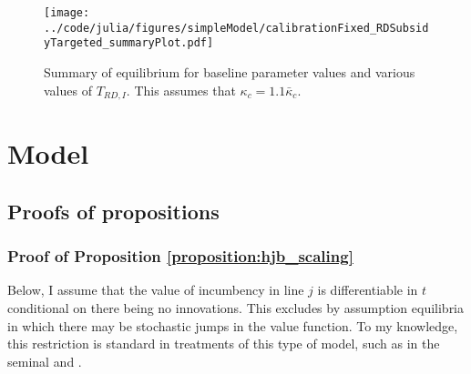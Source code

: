 \documentclass[11pt,english]{article}
\theoremstyle{definition}
\begin{document}
\begin{figure}[]
	\centering
	\texttt{[image: ../code/julia/figures/simpleModel/calibrationFixed\_RDSubsidyTargeted\_summaryPlot.pdf]}
	\caption{Summary of equilibrium for baseline parameter values and various values of $T_{RD,I}$. This assumes that $\kappa_c = 1.1 \bar{\kappa}_c$.}
	\label{calibration_RDSubsidyTargeted_summaryPlot}
\end{figure}


\section{Model}\label{appendix:model}

\subsection{Proofs of propositions}

\subsubsection{Proof of Proposition \ref{proposition:hjb_scaling}}\label{appendix:proofs:proposition:hjb_scaling}

Below, I assume that the value of incumbency in line $j$ is differentiable in $t$ conditional on there being no innovations. This excludes by assumption equilibria in which there may be stochastic jumps in the value function. To my knowledge, this restriction is standard in treatments of this type of model, such as in the seminal \cite{grossman_quality_1991} and \cite{acemoglu_introduction_2009}.
\end{document}
